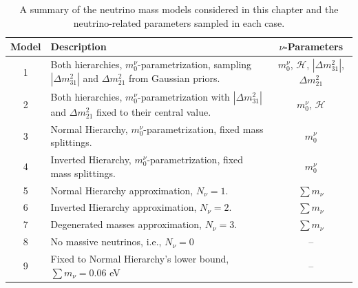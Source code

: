 \begin{table}
  \centering
  \caption{A summary of the neutrino mass models considered in this chapter and the neutrino-related parameters sampled in each case.}
  \label{Tb:Models1}
  \begin{tabular}{cp{80mm}|c}
    \hline
    \hline
    Model & Description & $\nu$-Parameters\\[0.1cm]
    \hline
    \hline
    
     1 & Both hierarchies, $m_0^{\nu}$-parametrization, sampling $|\Delta m_{31}^2|$ and $\Delta m_{21}^2$ from Gaussian priors. &  $m_0^{\nu}$, $\mathcal{H}$, $|\Delta m_{31}^2|$, $\Delta m_{21}^2$  \\
     
     2 & Both hierarchies,  $m_0^{\nu}$-parametrization with $|\Delta m_{31}^2|$ and $\Delta m_{21}^2$ fixed to their central value. &  $m_0^{\nu}$, $\mathcal{H}$ \\
     
     3 & Normal Hierarchy,  $m_0^{\nu}$-parametrization, fixed mass splittings. &  $m_0^{\nu}$ \\
     
     4 & Inverted Hierarchy,  $m_0^{\nu}$-parametrization, fixed mass splittings. &  $m_0^{\nu}$ \\
     
     \hline
     5 & Normal Hierarchy approximation, $N_{\nu}=1$.  &  $\sum m_{\nu}$ \\
     
     6 & Inverted Hierarchy approximation, $N_{\nu}=2$. &  $\sum m_{\nu}$ \\
     
     7 & Degenerated masses approximation, $N_{\nu}=3$. & $\sum m_{\nu}$ \\
     \hline
     8 & No massive neutrinos, i.e., $N_{\nu}=0$ &   -- \\
     9 & Fixed to Normal Hierarchy's lower bound, $\sum m_{\nu} = 0.06$ eV &  -- \\
     \hline
     \hline 
  \end{tabular}
\end{table}

